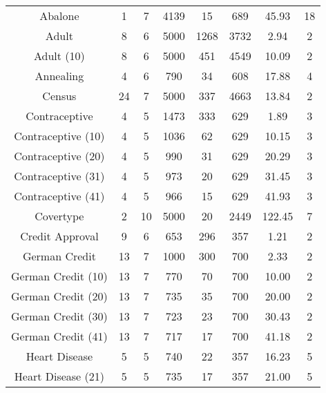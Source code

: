 \begin{longtable}{cccccccc}
\bottomrule
\endlastfoot
           Abalone &       1 &           7 &  4139 &         15 &        689 &  45.93 &       18 \\
             Adult &       8 &           6 &  5000 &       1268 &       3732 &   2.94 &        2 \\
        Adult (10) &       8 &           6 &  5000 &        451 &       4549 &  10.09 &        2 \\
         Annealing &       4 &           6 &   790 &         34 &        608 &  17.88 &        4 \\
            Census &      24 &           7 &  5000 &        337 &       4663 &  13.84 &        2 \\
     Contraceptive &       4 &           5 &  1473 &        333 &        629 &   1.89 &        3 \\
Contraceptive (10) &       4 &           5 &  1036 &         62 &        629 &  10.15 &        3 \\
Contraceptive (20) &       4 &           5 &   990 &         31 &        629 &  20.29 &        3 \\
Contraceptive (31) &       4 &           5 &   973 &         20 &        629 &  31.45 &        3 \\
Contraceptive (41) &       4 &           5 &   966 &         15 &        629 &  41.93 &        3 \\
         Covertype &       2 &          10 &  5000 &         20 &       2449 & 122.45 &        7 \\
   Credit Approval &       9 &           6 &   653 &        296 &        357 &   1.21 &        2 \\
     German Credit &      13 &           7 &  1000 &        300 &        700 &   2.33 &        2 \\
German Credit (10) &      13 &           7 &   770 &         70 &        700 &  10.00 &        2 \\
German Credit (20) &      13 &           7 &   735 &         35 &        700 &  20.00 &        2 \\
German Credit (30) &      13 &           7 &   723 &         23 &        700 &  30.43 &        2 \\
German Credit (41) &      13 &           7 &   717 &         17 &        700 &  41.18 &        2 \\
     Heart Disease &       5 &           5 &   740 &         22 &        357 &  16.23 &        5 \\
Heart Disease (21) &       5 &           5 &   735 &         17 &        357 &  21.00 &        5 \\
\end{longtable}
